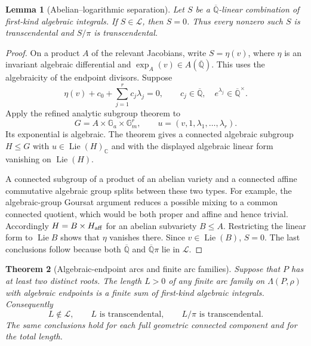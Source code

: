 \documentclass[11pt,a4paper]{article}
\newtheorem{theorem}{Theorem}[section]
\newtheorem{lemma}[theorem]{Lemma}
\theoremstyle{definition}
\theoremstyle{remark}
\numberwithin{equation}{section}
\newcommand{\Qbar}{\overline{\mathbb Q}}
\begin{document}
\begin{lemma}[Abelian--logarithmic separation]\label{lm-separation}
Let $S$ be a $\Qbar$-linear combination of first-kind algebraic integrals.
If $S\in\mathcal L$, then $S=0$.  Thus every nonzero such $S$ is
transcendental and $S/\pi$ is transcendental.
\end{lemma}

\begin{proof}
On a product $A$ of the relevant Jacobians, write $S=\eta(v)$, where
$\eta$ is an invariant algebraic differential and
$\exp_A(v)\in A(\Qbar)$.  This uses the algebraicity of the endpoint
divisors.  Suppose
\[
 \eta(v)+c_0+\sum_{j=1}^r c_j\lambda_j=0,
 \qquad c_j\in\Qbar,\quad e^{\lambda_j}\in\Qbar^\times.
\]
Apply the refined analytic subgroup theorem
\cite[Theorem~6.2]{lm-HuberWustholz} to
\[
 G=A\times\mathbb G_a\times\mathbb G_m^r,
 \qquad u=(v,1,\lambda_1,\ldots,\lambda_r).
\]
Its exponential is algebraic.  The theorem gives a connected algebraic
subgroup $H\le G$ with $u\in\operatorname{Lie}(H)_{\mathbb C}$ and with
the displayed algebraic linear form vanishing on $\operatorname{Lie}(H)$.

A connected subgroup of a product of an abelian variety and a connected
affine commutative algebraic group splits between these two types.  For
example, the algebraic-group Goursat argument reduces a possible mixing
to a common connected quotient, which would be both proper and affine
and hence trivial.  Accordingly $H=B\times H_{\rm aff}$ for an abelian
subvariety $B\le A$.  Restricting the linear form to $\operatorname{Lie}B$
shows that $\eta$ vanishes there.  Since $v\in\operatorname{Lie}(B)$,
$S=0$.  The last conclusions follow because both $\Qbar$ and
$\Qbar\pi$ lie in $\mathcal L$.
\end{proof}

\begin{theorem}[Algebraic-endpoint arcs and finite arc families]
\label{lm-arcs}
Suppose that $P$ has at least two distinct roots.  The length $L>0$ of any
finite arc family on $\Lambda(P,\rho)$ with algebraic endpoints is a
finite sum of first-kind algebraic integrals.  Consequently
\begin{equation}\label{lm-arcs-conclusion}
 L\notin\mathcal L,
 \qquad L\text{ is transcendental},\qquad
 L/\pi\text{ is transcendental}.
\end{equation}
The same conclusions hold for each full geometric connected component
and for the total length.
\end{theorem}
\end{document}
